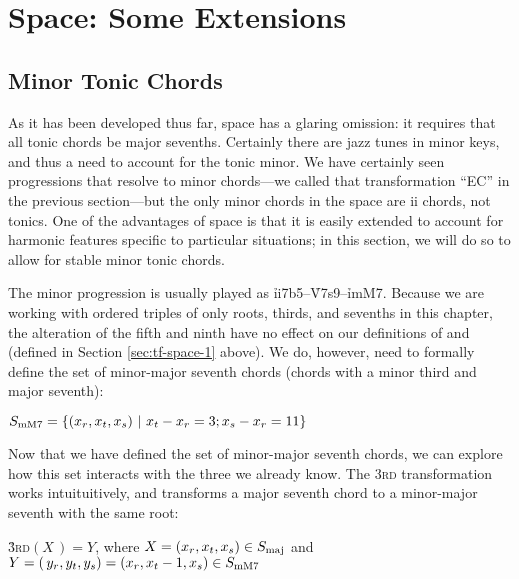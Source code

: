 {%




\section{\tf Space: Some Extensions}

\subsection{Minor Tonic Chords}

As it has been developed thus far, \tf space has a glaring omission: it
requires that all tonic chords be major sevenths. Certainly there are
jazz tunes in minor keys, and thus a need to account for the tonic minor. We
have certainly seen \tf progressions that resolve to minor chords---we called
that transformation ``EC'' in the previous section---but the only minor chords
in the space are ii chords, not tonics. One of the advantages of \tf space is
that it is easily extended to account for harmonic features specific to
particular situations; in this section, we will do so to allow for stable
minor tonic chords.

The minor \tfmo progression is usually played as
\mbox{\h{ii7b5}--\h{V7s9}--\h{i\thinspace{}mM7}}. Because
we are working with ordered triples of only roots, thirds, and sevenths in
this chapter, the alteration of the fifth and ninth have no effect on our
definitions of \Smin and \Sdom (defined in Section \ref{sec:tf-space-1}
above). We do, however, need to formally define the set of minor-major seventh
chords (chords with a minor third and major seventh):

\vspace{.5\baselineskip}
  $S_{\mathrm{mM7}} = \{ (x_r, x_t, x_s)\ |\ x_t - x_r = 3; x_s - x_r = 11 \}$
\vspace{.5\baselineskip}

Now that we have defined the set of minor-major seventh chords, we can explore
how this set interacts with the three we already know. The \textsc{3rd}
transformation works intuituitively, and transforms a major seventh chord to a
minor-major seventh with the same root:

\vspace{.5\baselineskip}
  \h{3}\textsc{rd}$(X\,) = Y$, where $X = (x_r, x_t, x_s) \in S_{\mathrm{maj}}$ and
  $Y=(\,y_r, y_t, y_s)=(x_r, x_t-1, x_s) \in S_{\mathrm{mM7}}$
\vspace{.5\baselineskip}

}
